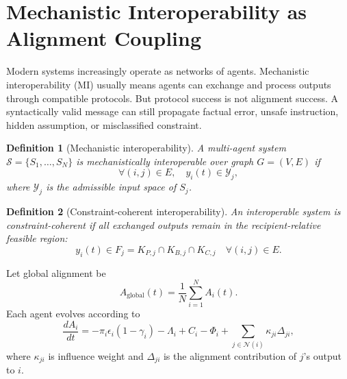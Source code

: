 \documentclass[11pt]{article}
\newtheorem{definition}{Definition}
\newcommand{\Aglobal}{A_{\mathrm{global}}}
\newcommand{\eps}{\epsilon}
\newcommand{\gam}{\gamma}
\newcommand{\Scal}{\mathcal{S}}
\begin{document}
\section{Mechanistic Interoperability as Alignment Coupling}

Modern systems increasingly operate as networks of agents. Mechanistic interoperability (MI) usually means agents can exchange and process outputs through compatible protocols. But protocol success is not alignment success. A syntactically valid message can still propagate factual error, unsafe instruction, hidden assumption, or misclassified constraint.

\begin{definition}[Mechanistic interoperability]
A multi-agent system $\Scal=\{S_1,\ldots,S_N\}$ is mechanistically interoperable over graph $G=(V,E)$ if
\begin{equation}
\forall (i,j)\in E,\quad y_i(t)\in\mathcal{Y}_j,
\end{equation}
where $\mathcal{Y}_j$ is the admissible input space of $S_j$.
\end{definition}

\begin{definition}[Constraint-coherent interoperability]
An interoperable system is constraint-coherent if all exchanged outputs remain in the recipient-relative feasible region:
\begin{equation}
y_i(t)\in F_j=K_{P,j}\cap K_{B,j}\cap K_{C,j}\quad \forall(i,j)\in E.
\end{equation}
\end{definition}

Let global alignment be
\begin{equation}
\Aglobal(t)=\frac{1}{N}\sum_{i=1}^N A_i(t).
\end{equation}
Each agent evolves according to
\begin{equation}
\frac{dA_i}{dt}= -\pi_i\eps_i(1-\gam_i)-\Lambda_i+C_i-\Phi_i+\sum_{j\in\mathcal{N}(i)}\kappa_{ji}\Delta_{ji},
\label{eq:multi-agent}
\end{equation}
where $\kappa_{ji}$ is influence weight and $\Delta_{ji}$ is the alignment contribution of $j$'s output to $i$.
\end{document}
